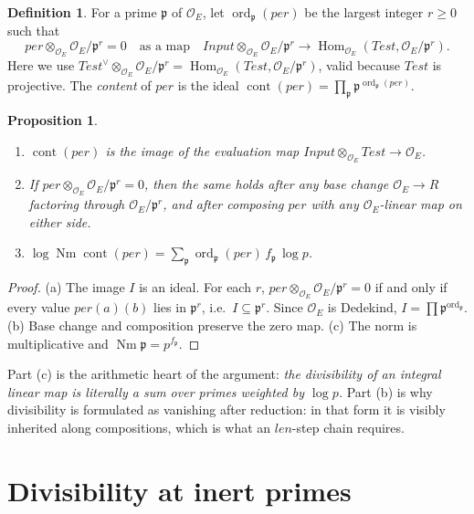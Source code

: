 \documentclass[11pt]{amsart}
\newtheorem{proposition}[theorem]{Proposition}
\theoremstyle{definition}
\newtheorem{definition}[theorem]{Definition}
\theoremstyle{remark}
\newcommand{\OEring}{\mathcal{O}_E}
\newcommand{\Input}{\mathit{Input}}
\newcommand{\Test}{\mathit{Test}}
\newcommand{\per}{\mathit{per}}
\newcommand{\len}{\mathit{len}}
\DeclareMathOperator{\Hom}{Hom}
\DeclareMathOperator{\Nm}{Nm}
\DeclareMathOperator{\ord}{ord}
\DeclareMathOperator{\cont}{cont}
\newcommand{\pp}{\mathfrak{p}}
\newcommand{\dual}{^{\vee}}
\begin{document}
\begin{definition}\label{def:content}
For a prime $\pp$ of $\OEring$, let $\ord_\pp(\per)$ be the largest integer $r\geq0$ such that
\[
\per\otimes_{\OEring}\OEring/\pp^r=0\quad\text{as a map}\quad
\Input\otimes_{\OEring}\OEring/\pp^r\to\Hom_{\OEring}(\Test,\OEring/\pp^r).
\]
Here we use $\Test\dual\otimes_{\OEring}\OEring/\pp^r=\Hom_{\OEring}(\Test,\OEring/\pp^r)$, valid because $\Test$ is projective. The \emph{content} of $\per$ is the ideal $\cont(\per)=\prod_\pp\pp^{\ord_\pp(\per)}$.
\end{definition}

\begin{proposition}\label{prop:content}
\begin{enumerate}[label=(\alph*)]
\item $\cont(\per)$ is the image of the evaluation map $\Input\otimes_{\OEring}\Test\to\OEring$.
\item If $\per\otimes_{\OEring}\OEring/\pp^r=0$, then the same holds after any base change $\OEring\to R$ factoring through $\OEring/\pp^r$, and after composing $\per$ with any $\OEring$-linear map on either side.
\item $\log\Nm\cont(\per)=\sum_{\pp}\ord_\pp(\per)\,f_\pp\,\log p$.
\end{enumerate}
\end{proposition}

\begin{proof}
(a) The image $I$ is an ideal. For each $r$, $\per\otimes_{\OEring}\OEring/\pp^r=0$ if and only if every value $\per(a)(b)$ lies in $\pp^r$, i.e.\ $I\subseteq\pp^r$. Since $\OEring$ is Dedekind, $I=\prod\pp^{\ord_\pp}$.
(b) Base change and composition preserve the zero map.
(c) The norm is multiplicative and $\Nm\pp=p^{f_\pp}$.
\end{proof}

Part (c) is the arithmetic heart of the argument: \emph{the divisibility of an integral linear map is literally a sum over primes weighted by $\log p$.} Part (b) is why divisibility is formulated as vanishing after reduction: in that form it is visibly inherited along compositions, which is what an $\len$-step chain requires.

\section{Divisibility at inert primes}\label{sec:divisibility}
\end{document}
